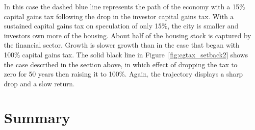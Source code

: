 In this case the dashed blue line represents the path of the economy with a 15\% capital gains tax following the drop in the investor capital gains tax. %
With a sustained capital gains tax on speculation of only 15\%, the city is smaller and investors own more of the housing. About half of the housing stock is captured by the financial sector. 
Growth is slower growth than in the case that began with 100\% capital gains tax. %
The solid black line in Figure~\ref{fig:cgtax_setback2} shows the case described in the section above, in which effect of dropping the tax to zero for 50 years then raising it to 100\%. Again, the trajectory displays a sharp drop and a slow return. 







\section{Summary}


